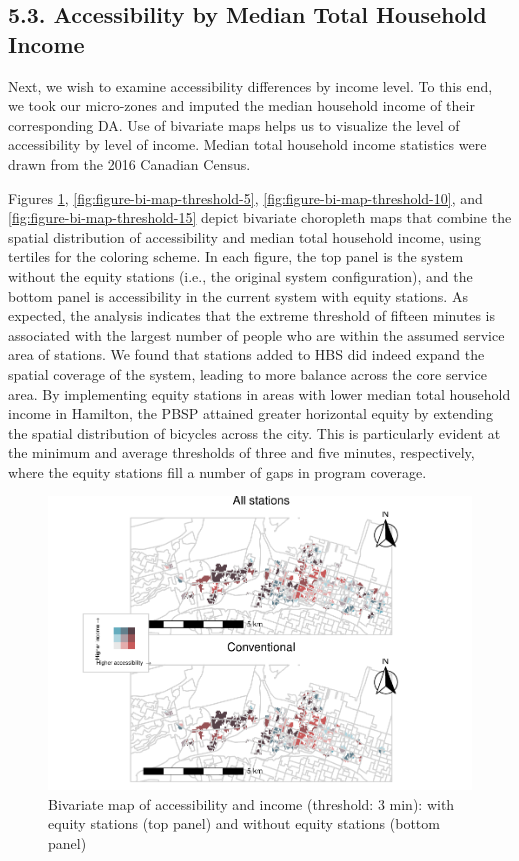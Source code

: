 \documentclass[]{elsarticle} %
\begin{document}
\hypertarget{accessibility-by-median-total-household-income}{%
\subsection{5.3. Accessibility by Median Total Household
Income}\label{accessibility-by-median-total-household-income}}

Next, we wish to examine accessibility differences by income level. To
this end, we took our micro-zones and imputed the median household
income of their corresponding DA. Use of bivariate maps helps us to
visualize the level of accessibility by level of income. Median total
household income statistics were drawn from the 2016 Canadian Census.

Figures \ref{fig:figure-bi-map-threshold-3},
\ref{fig:figure-bi-map-threshold-5},
\ref{fig:figure-bi-map-threshold-10}, and
\ref{fig:figure-bi-map-threshold-15} depict bivariate choropleth maps
that combine the spatial distribution of accessibility and median total
household income, using tertiles for the coloring scheme. In each
figure, the top panel is the system without the equity stations (i.e.,
the original system configuration), and the bottom panel is
accessibility in the current system with equity stations. As expected,
the analysis indicates that the extreme threshold of fifteen minutes is
associated with the largest number of people who are within the assumed
service area of stations. We found that stations added to HBS did indeed
expand the spatial coverage of the system, leading to more balance
across the core service area. By implementing equity stations in areas
with lower median total household income in Hamilton, the PBSP attained
greater horizontal equity by extending the spatial distribution of
bicycles across the city. This is particularly evident at the minimum
and average thresholds of three and five minutes, respectively, where
the equity stations fill a number of gaps in program coverage.

\begin{figure}
\includegraphics[width=1.2\linewidth]{Bike-share-spatial-equity_files/figure-latex/figure-bi-map-threshold-3-1} \caption{\label{fig-bivariate-map-threshold-3}Bivariate map of accessibility and income (threshold: 3 min): with equity stations (top panel) and without equity stations (bottom panel)}\label{fig:figure-bi-map-threshold-3}
\end{figure}
\end{document}

